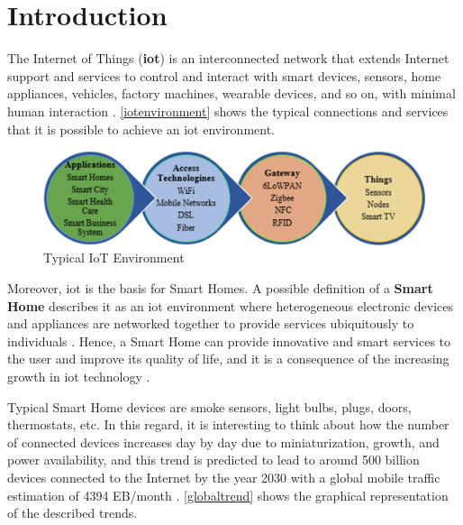 \chapter{Introduction}
\label{introduction}


The Internet of Things (\textbf{\gls{iot}}) is an interconnected network that extends Internet support and services to control and interact with smart devices, sensors, home appliances, vehicles, factory machines, wearable devices, and so on, with minimal human interaction \cite{touqeer2021smart}. \autoref{iotenvironment} shows the typical connections and services that it is possible to achieve an \gls{iot} environment.

    \begin{figure}[H]
        \centering
        \includegraphics[scale=0.30]{images/introduction/iot_schema.jpg}
        \caption{Typical IoT Environment}
        \label{iotenvironment}
    \end{figure}

Moreover, \gls{iot} is the basis for Smart Homes. A possible definition of a \textbf{Smart Home} describes it as an \gls{iot} environment where heterogeneous electronic devices and appliances are networked together to provide services ubiquitously to individuals \cite{shouran2019internet}. Hence, a Smart Home can provide innovative and smart services to the user and improve its quality of life, and it is a consequence of the increasing growth in \gls{iot} technology \cite{kumar2017security,vimal2015internet}.

Typical Smart Home devices are smoke sensors, light bulbs, plugs, doors, thermostats, etc. In this regard, it is interesting to think about how the number of connected devices increases day by day due to miniaturization, growth, and power availability, and this trend is predicted to lead to around 500 billion devices connected to the Internet by the year 2030 with a global mobile traffic estimation of 4394 EB/month \cite{yastrebova2018future}. \autoref{globaltrend} shows the graphical representation of the described trends.

